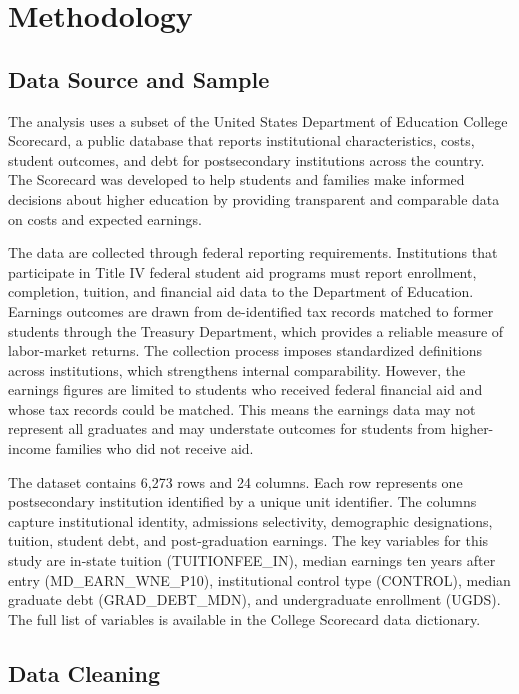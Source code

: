 \section{Methodology}

\subsection{Data Source and Sample}

The analysis uses a subset of the United States Department of Education College Scorecard, a public database that reports institutional characteristics, costs, student outcomes, and debt for postsecondary institutions across the country. The Scorecard was developed to help students and families make informed decisions about higher education by providing transparent and comparable data on costs and expected earnings.

The data are collected through federal reporting requirements. Institutions that participate in Title IV federal student aid programs must report enrollment, completion, tuition, and financial aid data to the Department of Education. Earnings outcomes are drawn from de-identified tax records matched to former students through the Treasury Department, which provides a reliable measure of labor-market returns. The collection process imposes standardized definitions across institutions, which strengthens internal comparability. However, the earnings figures are limited to students who received federal financial aid and whose tax records could be matched. This means the earnings data may not represent all graduates and may understate outcomes for students from higher-income families who did not receive aid.

The dataset contains 6,273 rows and 24 columns. Each row represents one postsecondary institution identified by a unique unit identifier. The columns capture institutional identity, admissions selectivity, demographic designations, tuition, student debt, and post-graduation earnings. The key variables for this study are in-state tuition (TUITIONFEE\_IN), median earnings ten years after entry (MD\_EARN\_WNE\_P10), institutional control type (CONTROL), median graduate debt (GRAD\_DEBT\_MDN), and undergraduate enrollment (UGDS). The full list of variables is available in the College Scorecard data dictionary.

\subsection{Data Cleaning}

